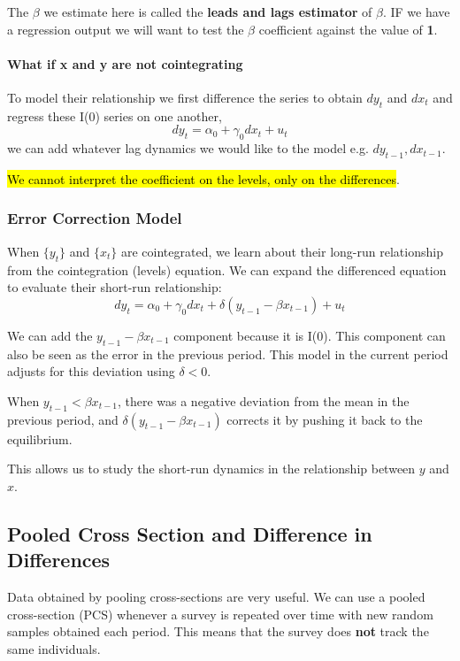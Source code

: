 \documentclass[11pt]{article}
\begin{document}
 The $\beta$ we estimate here is called the \textbf{leads and lags estimator} of $\beta$. IF we have a regression output we will want to test the $\beta$ coefficient against the value of \textbf{1}.

 \paragraph{What if x and y are not cointegrating} \mbox{}

 To model their relationship we first difference the series to obtain $dy_t$ and $dx_t$ and regress these I(0) series on one another,
 \[dy_t = \alpha_0 + \gamma_0 dx_t + u_t\]
 we can add whatever lag dynamics we would like to the model e.g. $dy_{t-1}, dx_{t-1}$.

 \hl{We cannot interpret the coefficient on the levels, only on the differences}.

 \subsubsection{Error Correction Model}

 When $\{y_t\}$ and $\{x_t\}$ are cointegrated, we learn about their long-run relationship from the cointegration (levels) equation. We can expand the differenced equation to evaluate their short-run relationship:
 \begin{equation}
d y_t=\alpha_0+\gamma_0 d x_t+\delta\left(y_{t-1}-\beta x_{t-1}\right)+u_t
\end{equation}

We can add the $y_{t-1}-\beta x_{t-1}$ component because it is I(0). This component can also be seen as the error in the previous period. This model in the current period adjusts for this deviation using $\delta<0$.

When $y_{t-1}<\beta x_{t-1}$, there was a negative deviation from the mean in the previous period, and $\delta(y_{t-1}-\beta x_{t-1})$ corrects it by pushing it back to the equilibrium.

This allows us to study the short-run dynamics in the relationship between $y$ and $x$.

\subsection{Pooled Cross Section and Difference in Differences}

Data obtained by pooling cross-sections are very useful. We can use a pooled cross-section (PCS) whenever a survey is repeated over time with new random samples obtained each period. This means that the survey does \textbf{not} track the same individuals.
\end{document}
